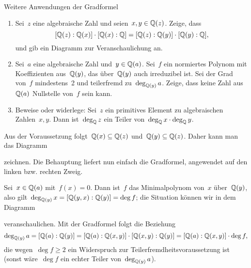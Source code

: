 \documentclass{algblatt}
\begin{document}
\begin{aufgabe}{Weitere Anwendungen der Gradformel}
\begin{enumerate}
\item Sei~$z$ eine algebraische Zahl und seien~$x, y \in \mathbb{Q}(z)$. Zeige, dass
\[ [\mathbb{Q}(z):\mathbb{Q}(x)] \cdot [\mathbb{Q}(x):\mathbb{Q}] = [\mathbb{Q}(z):\mathbb{Q}(y)] \cdot
[\mathbb{Q}(y):\mathbb{Q}], \]
und gib ein Diagramm zur Veranschaulichung an.
\item Sei~$a$ eine algebraische Zahl und~$y \in \mathbb{Q}(a)$. Sei~$f$ ein normiertes
Polynom mit Koeffizienten aus~$\mathbb{Q}(y)$, das über~$\mathbb{Q}(y)$ auch
irreduzibel ist. Sei der Grad von~$f$ mindestens~2 und teilerfremd
zu~$\deg_{\mathbb{Q}(y)} a$. Zeige, dass keine Zahl aus~$\mathbb{Q}(a)$ Nullstelle von~$f$
sein kann.

\item Beweise oder widerlege: Sei~$z$ ein primitives Element zu algebraischen
Zahlen~$x, y$. Dann ist~$\deg_{\mathbb{Q}} z$ ein Teiler von~$\deg_{\mathbb{Q}} x \cdot \deg_{\mathbb{Q}}
y$.
\end{enumerate}

\begin{loesungE}
\item Aus der Voraussetzung folgt~$\mathbb{Q}(x) \subseteq \mathbb{Q}(z)$ und~$\mathbb{Q}(y)
\subseteq \mathbb{Q}(z)$. Daher kann man das Diagramm
\begin{center}\end{center}
zeichnen. Die Behauptung liefert nun einfach die Gradformel, angewendet auf den
linken bzw. rechten Zweig.

\item Sei~$x \in \mathbb{Q}(a)$ mit~$f(x) = 0$. Dann ist~$f$ das Minimalpolynom
von~$x$ über~$\mathbb{Q}(y)$, also gilt~$\deg_{\mathbb{Q}(y)} x = [\mathbb{Q}(y,x):\mathbb{Q}(y)] =
\deg f$; die Situation können wir in dem Diagramm
\begin{center}\end{center}
veranschaulichen. Mit der Gradformel folgt die Beziehung
\[ \deg_{\mathbb{Q}(y)} a = [\mathbb{Q}(a):\mathbb{Q}(y)] = [\mathbb{Q}(a):\mathbb{Q}(x,y)] \cdot [\mathbb{Q}(x,y):\mathbb{Q}(y)] =
  [\mathbb{Q}(a):\mathbb{Q}(x,y)] \cdot \deg f, \]
die wegen~$\deg f \geq 2$ ein Widerspruch zur Teilerfremdheitsvoraussetzung
ist (sonst wäre~$\deg f$ ein echter Teiler von~$\deg_{\mathbb{Q}(y)} a$).


\end{loesungE}
\end{aufgabe}
\end{document}
